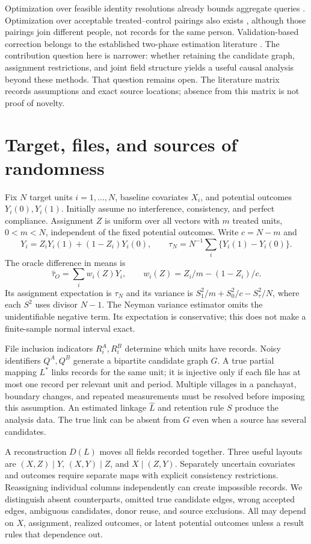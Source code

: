 \documentclass[11pt]{article}
\begin{document}
Optimization over feasible identity resolutions already bounds aggregate queries
\cite{turkcapar}. Optimization over acceptable treated--control pairings also exists
\cite{morucci}, although those pairings join different people, not records for the same
person. Validation-based correction belongs to the established two-phase estimation
literature \cite{twophase}. The contribution question here is narrower: whether retaining
the candidate graph, assignment restrictions, and joint field structure yields a useful
causal analysis beyond these methods. That question remains open. The literature matrix
records assumptions and exact source locations; absence from this matrix is not proof
of novelty.

\section{Target, files, and sources of randomness}
Fix $N$ target units $i=1,\ldots,N$, baseline covariates $X_i$, and potential outcomes
$Y_i(0),Y_i(1)$. Initially assume no interference, consistency, and perfect compliance.
Assignment $Z$ is uniform over all vectors with $m$ treated units, $0<m<N$, independent
of the fixed potential outcomes. Write $c=N-m$ and
\[
 Y_i=Z_iY_i(1)+(1-Z_i)Y_i(0),\qquad
 \tau_N=N^{-1}\sum_i\{Y_i(1)-Y_i(0)\}.
\]
The oracle difference in means is
\[
 \widehat\tau_O=\sum_iw_i(Z)Y_i,\qquad w_i(Z)=Z_i/m-(1-Z_i)/c.
\]
Its assignment expectation is $\tau_N$ and its variance is
$S_1^2/m+S_0^2/c-S_\tau^2/N$, where each $S^2$ uses divisor $N-1$.
The Neyman variance estimator omits the unidentifiable negative term. Its expectation
is conservative; this does not make a finite-sample normal interval exact.

File inclusion indicators $R_i^A,R_i^B$ determine which units have records. Noisy
identifiers $Q^A,Q^B$ generate a bipartite candidate graph $G$. A true partial mapping
$L^*$ links records for the same unit; it is injective only if each file has at most
one record per relevant unit and period. Multiple villages in a panchayat, boundary
changes, and repeated measurements must be resolved before imposing this assumption.
An estimated linkage $\widehat L$ and retention rule $S$ produce the analysis data.
The true link can be absent from $G$ even when a source has several candidates.

A reconstruction $D(L)$ moves all fields recorded together. Three useful layouts are
$(X,Z)\mid Y$, $(X,Y)\mid Z$, and $X\mid(Z,Y)$. Separately uncertain covariates and
outcomes require separate maps with explicit consistency restrictions. Reassigning
individual columns independently can create impossible records. We distinguish absent
counterparts, omitted true candidate edges, wrong accepted edges, ambiguous candidates,
donor reuse, and source exclusions. All may depend on $X$, assignment, realized outcomes,
or latent potential outcomes unless a result rules that dependence out.
\end{document}
